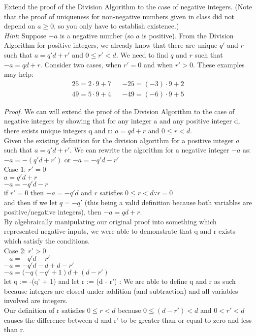 \documentclass[solution,letterpaper]{cs20}
\begin{document}
    \begin{problem}
        Extend the proof of the Division Algorithm to the case of negative integers. (Note that the proof of uniqueness for non-negative numbers given in class did not depend on $a \geq 0$, so you only have to establish existence.) \\
        \emph{Hint}: Suppose $-a$ is a negative number (so $a$ is positive). From the Division Algorithm for positive integers, we already know that there are unique $q'$ and $r$ such that $a=q'd+r'$ and $0\leq r'<d$. We need to find $q$ and $r$ such that $-a=qd+r$. Consider two cases, when $r'=0$ and when $r'>0$. These examples may help:
        \begin{align}
            25=2\cdot9+7 &  & -25=(-3)\cdot 9+2 \\
            49=5\cdot 9+4 &  & -49=(-6)\cdot 9+5
        \end{align}
        \begin{solution}
            \emph{Proof.} We can will extend the proof of the Division Algorithm to the case of negative integers by showing that for any integer a and any positive integer d, there exists unique integers q and r: $a = qd + r$ and $0 \leq r < d$. \\
            Given the existing definition for the division algorithm for a positive integer $a$ such that
            $a = q'd + r'$. We can rewrite the algorithm for a negative integer $-a$ as: $-a = -(q'd + r')$ or $-a = -q'd - r'$ \\

            Case 1: $r' = 0$ \\
            $a = q'd +r$\\
            $-a = -q'd - r$ \\
            if $r' = 0$ then $-a = -q'd$ and  $r$ satisfies $0 \leq r < d \because r = 0$ \\
            and then if we let $q = -q'$ (this being a valid definition because both variables are positive/negative integers), then $-a = qd + r$. \\
            By algebraically manipulating our original proof into something which represented negative inputs, we were able to demonstrate that q and r exists which satisfy the conditions. \\

            Case 2: $r' > 0$ \\
            $-a = -q'd - r'$ \\
            $-a = -q'd - d + d - r'$ \\
            $-a = (-q(-q' + 1)d + (d - r')$ \\
            let q := -(q' + 1) and let r := (d - r') : We are able to define q and r as such because integers are closed under addition (and subtraction) and all variables involved are integers. \\
            Our definition of r satisfies $0 \leq r < d$ because $0 \leq (d - r') < d$ and $0 < r' < d$ causes the difference between d and r' to be greater than or equal to zero and less than r.


\end{solution}
\end{problem}
\end{document}
